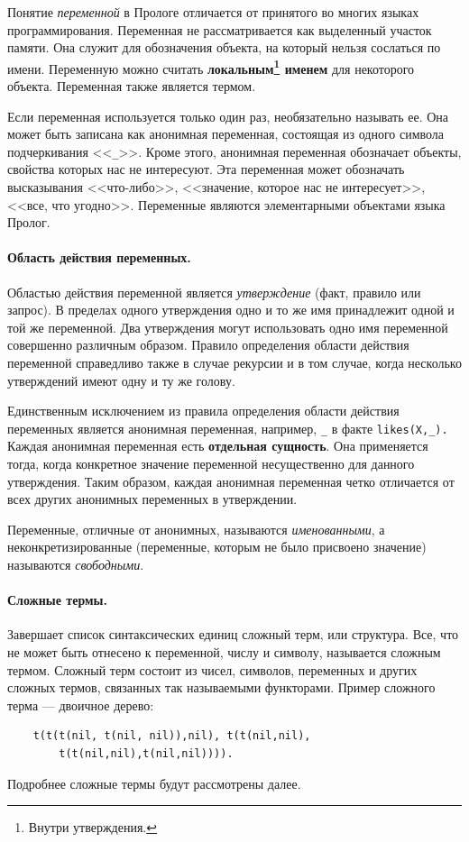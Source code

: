\documentclass[12pt, openany, twoside]{book} %
\begin{document}
Понятие \emph{переменной} в Прологе отличается от принятого во многих  языках программирования. Переменная не рассматривается как выделенный участок памяти. Она служит для обозначения объекта, на который нельзя сослаться по имени. Переменную можно считать {\bf локальным\footnote{Внутри утверждения.} именем} для некоторого объекта. Переменная также является термом.

Если переменная используется только один раз, необязательно называть ее. Она может быть записана как анонимная переменная, состоящая из одного символа подчеркивания <<{\tt \_}>>. Кроме этого, анонимная переменная обозначает объекты, свойства которых нас не интересуют. Эта переменная может обозначать высказывания <<что-либо>>, <<значение, которое нас не интересует>>, <<все, что угодно>>. Переменные являются элементарными объектами языка Пролог.

\paragraph{Область действия переменных.} Областью действия переменной является \emph{утверждение} (факт, правило или запрос). В пределах одного утверждения одно и то же имя принадлежит одной и той же переменной. Два утверждения могут использовать одно имя переменной совершенно различным образом. Правило определения области действия переменной справедливо также в случае рекурсии и в том случае, когда несколько утверждений имеют одну и ту же голову.

Единственным исключением из правила определения области действия переменных является анонимная переменная, например, {\tt \_} в факте {\tt likes(Х,\_).} Каждая анонимная переменная есть {\bf отдельная сущность}. Она применяется тогда, когда конкретное значение переменной несущественно для данного утверждения. Таким образом, каждая анонимная переменная четко отличается от всех других анонимных переменных в утверждении.

Переменные, отличные от анонимных, называются {\em именованными}, а неконкретизированные (переменные, которым не было присвоено значение) называются {\em свободными}.

\paragraph{Сложные термы.} Завершает список синтаксических единиц сложный терм, или структура. Все, что не может быть отнесено к переменной, числу и символу, называется сложным термом. Сложный терм состоит из чисел, символов, переменных и других сложных термов, связанных так называемыми функторами. Пример сложного терма --- двоичное дерево:
{\tt\begin{verbatim}
    t(t(t(nil, t(nil, nil)),nil), t(t(nil,nil),
        t(t(nil,nil),t(nil,nil)))).
\end{verbatim}}
\noindent Подробнее сложные термы будут рассмотрены далее.
\end{document}
